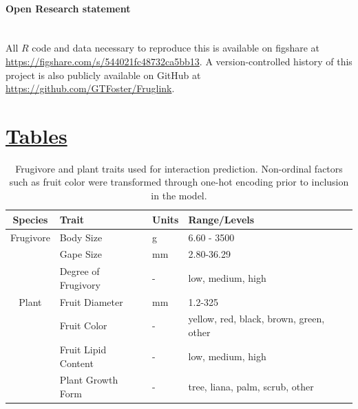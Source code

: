 \paragraph*{Open Research statement}\mbox{}\\
All $R$ code and data necessary to reproduce this is available on figshare at \\ \url{https://figshare.com/s/544021fc48732ca5bb13}. A version-controlled history of this project is also publicly available on GitHub at \url{https://github.com/GTFoster/Fruglink}.
\newpage


\section*{\textbf{\underline{Tables}}} 


\begin{table}[H]
\caption[Frugivore and plant traits used for interaction prediction]{Frugivore and plant traits used for interaction prediction. Non-ordinal factors such as fruit color were transformed through one-hot encoding prior to inclusion in the model.}
\vspace{20pt}
\label{tab:traits}
\begin{tabular}{clll} 
 \hline
 Species & Trait & Units & Range/Levels \\  
 \hline
 \hline
Frugivore & Body Size &  g &  6.60 - 3500 \\
& Gape Size &   mm  & 2.80-36.29  \\  
& Degree of Frugivory &  -   &  low, medium, high \\  
Plant & Fruit Diameter &  mm  & 1.2-325  \\
& Fruit Color &  -  & yellow, red, black, brown, green, other \\
& Fruit Lipid Content &  -   &  low, medium, high  \\ 
& Plant Growth Form &   -  &  tree, liana, palm, scrub, other \\ 
 \hline
\end{tabular}
\end{table}


\clearpage 


